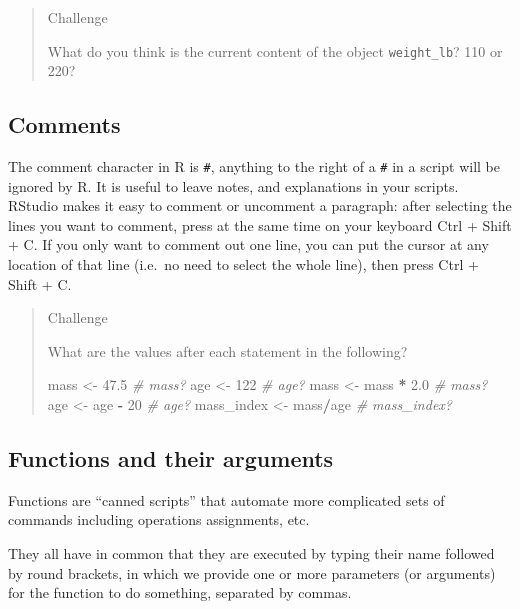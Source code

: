 \documentclass[]{book}
\newenvironment{Shaded}{\begin{snugshade}}{\end{snugshade}}
\newcommand{\DecValTok}[1]{\textcolor[rgb]{0.00,0.00,0.81}{#1}}
\newcommand{\FloatTok}[1]{\textcolor[rgb]{0.00,0.00,0.81}{#1}}
\newcommand{\StringTok}[1]{\textcolor[rgb]{0.31,0.60,0.02}{#1}}
\newcommand{\CommentTok}[1]{\textcolor[rgb]{0.56,0.35,0.01}{\textit{#1}}}
\newcommand{\OperatorTok}[1]{\textcolor[rgb]{0.81,0.36,0.00}{\textbf{#1}}}
\newcommand{\NormalTok}[1]{#1}
\begin{document}
\begin{quote}
Challenge

What do you think is the current content of the object
\texttt{weight\_lb}? 110 or 220?
\end{quote}

\subsection{Comments}\label{comments}

The comment character in R is \texttt{\#}, anything to the right of a
\texttt{\#} in a script will be ignored by R. It is useful to leave
notes, and explanations in your scripts. RStudio makes it easy to
comment or uncomment a paragraph: after selecting the lines you want to
comment, press at the same time on your keyboard Ctrl + Shift + C. If
you only want to comment out one line, you can put the cursor at any
location of that line (i.e.~no need to select the whole line), then
press Ctrl + Shift + C.

\begin{quote}
Challenge

What are the values after each statement in the following?

\begin{Shaded}
\begin{Highlighting}[]
\NormalTok{mass <-}\StringTok{ }\FloatTok{47.5}            \CommentTok{# mass?}
\NormalTok{age  <-}\StringTok{ }\DecValTok{122}             \CommentTok{# age?}
\NormalTok{mass <-}\StringTok{ }\NormalTok{mass }\OperatorTok{*}\StringTok{ }\FloatTok{2.0}      \CommentTok{# mass?}
\NormalTok{age  <-}\StringTok{ }\NormalTok{age }\OperatorTok{-}\StringTok{ }\DecValTok{20}        \CommentTok{# age?}
\NormalTok{mass_index <-}\StringTok{ }\NormalTok{mass}\OperatorTok{/}\NormalTok{age  }\CommentTok{# mass_index?}
\end{Highlighting}
\end{Shaded}
\end{quote}

\subsection{Functions and their
arguments}\label{functions-and-their-arguments}

Functions are ``canned scripts'' that automate more complicated sets of
commands including operations assignments, etc.

They all have in common that they are executed by typing their name
followed by round brackets, in which we provide one or more parameters
(or arguments) for the function to do something, separated by commas.
\end{document}
